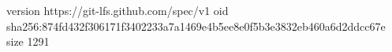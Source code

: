 version https://git-lfs.github.com/spec/v1
oid sha256:874fd432f306171f3402233a7a1469e4b5ee8e0f5b3e3832eb460a6d2ddcc67e
size 1291
